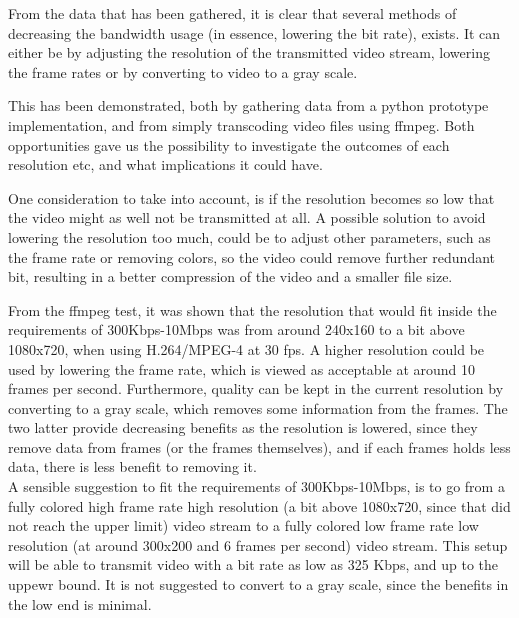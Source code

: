 From the data that has been gathered, it is clear that several methods of decreasing the bandwidth usage (in essence, lowering the bit rate), exists. It can either be by adjusting the resolution of the transmitted video stream, lowering the frame rates or by converting to video to a gray scale.

This has been demonstrated, both by gathering data from a python prototype implementation, and from simply transcoding video files using ffmpeg. Both opportunities gave us the possibility to investigate the outcomes of each resolution etc, and what implications it could have. 

One consideration to take into account, is if the resolution becomes so low that the video might as well not be transmitted at all. A possible solution to avoid lowering the resolution too much, could be to adjust other parameters, such as the frame rate or removing colors, so the video could remove further redundant bit, resulting in a better compression of the video and a smaller file size.

From the ffmpeg test, it was shown that the resolution that would fit inside the requirements of 300Kbps-10Mbps was from around 240x160 to a bit above 1080x720, when using H.264/MPEG-4 at 30 fps. A higher resolution could be used by lowering the frame rate, which is viewed as acceptable at around 10 frames per second. Furthermore, quality can be kept in the current resolution by converting to a gray scale, which removes some information from the frames. The two latter provide decreasing benefits as the resolution is lowered, since they remove data from frames (or the frames themselves), and if each frames holds less data, there is less benefit to removing it.\\

A sensible suggestion to fit the requirements of 300Kbps-10Mbps, is to go from a fully colored high frame rate high resolution (a bit above 1080x720, since that did not reach the upper limit) video stream to a fully colored low frame rate low resolution (at around 300x200 and 6 frames per second) video stream. This setup will be able to transmit video with a bit rate as low as 325 Kbps, and up to the uppewr bound. It is not suggested to convert to a gray scale, since the benefits in the low end is minimal.\\
